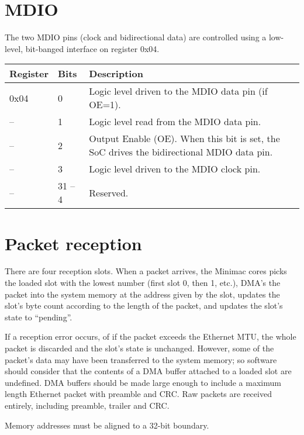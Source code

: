 \documentclass[a4paper,11pt]{article}
\begin{document}
\section{MDIO}
The two MDIO pins (clock and bidirectional data) are controlled using a low-level, bit-banged interface on register 0x04.

\begin{tabularx}{450pt}{|l|l|X|}
\hline
\textbf{Register} & \textbf{Bits} & \textbf{Description} \\
\hline
0x04 & 0 & Logic level driven to the MDIO data pin (if OE=1). \\
\hline
-- & 1 & Logic level read from the MDIO data pin. \\
\hline
-- & 2 & Output Enable (OE). When this bit is set, the SoC drives the bidirectional MDIO data pin. \\
\hline
-- & 3 & Logic level driven to the MDIO clock pin. \\
\hline
-- & 31 -- 4 & Reserved. \\
\hline
\end{tabularx}

\section{Packet reception}
There are four reception slots. When a packet arrives, the Minimac cores picks the loaded slot with the lowest number (first slot 0, then 1, etc.), DMA's the packet into the system memory at the address given by the slot, updates the slot's byte count according to the length of the packet, and updates the slot's state to ``pending''.

If a reception error occurs, of if the packet exceeds the Ethernet MTU, the whole packet is discarded and the slot's state is unchanged. However, some of the packet's data may have been transferred to the system memory; so software should consider that the contents of a DMA buffer attached to a loaded slot are undefined. DMA buffers should be made large enough to include a maximum length Ethernet packet with preamble and CRC. Raw packets are received entirely, including preamble, trailer and CRC.

Memory addresses must be aligned to a 32-bit boundary.
\end{document}
